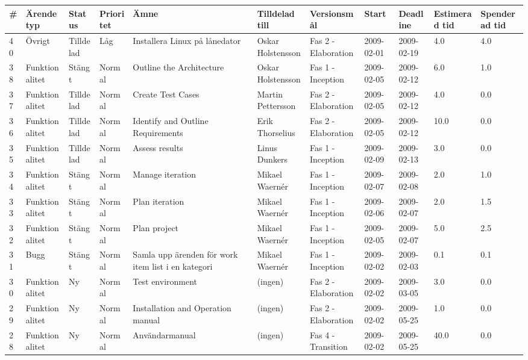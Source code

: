 \begin{center}
	\begin{tabular}{| m{0.5cm} | l | l | l | m{5cm} | l | l | l | l | m{1.5cm} | m{1.5cm} |}
\hline \# & Ärendetyp & Status & Prioritet & Ämne & Tilldelad till & Versionsmål & Start & Deadline & Estimerad tid & Spenderad tid \\
\hline 40 & Övrigt & Tilldelad & Låg & Installera Linux på lånedator & Oskar Holstensson & Fas 2 - Elaboration & 2009-02-01 & 2009-02-19 & 4.0 & 4.0\\
\hline 38 & Funktionalitet & Stängt & Normal & Outline the Architecture & Oskar Holstensson & Fas 1 - Inception & 2009-02-05 & 2009-02-12 & 6.0 & 1.0 \\
\hline 37 & Funktionalitet & Tilldelad & Normal & Create Test Cases & Martin Pettersson & Fas 2 - Elaboration & 2009-02-05 & 2009-02-12 & 4.0 & 0.0 \\
\hline 36 & Funktionalitet & Tilldelad & Normal & Identify and Outline Requirements & Erik Thorselius & Fas 2 - Elaboration & 2009-02-05 & 2009-02-12 & 10.0 & 0.0 \\
\hline 35 & Funktionalitet & Tilldelad & Normal & Assess results & Linus Dunkers & Fas 1 - Inception & 2009-02-09 & 2009-02-13 & 3.0 & 0.0 \\
\hline 34 & Funktionalitet & Stängt & Normal & Manage iteration & Mikael Waernér & Fas 1 - Inception & 2009-02-07 & 2009-02-08 & 2.0 & 1.0 \\
\hline 33 & Funktionalitet & Stängt & Normal & Plan iteration & Mikael Waernér & Fas 1 - Inception & 2009-02-06 & 2009-02-07 & 2.0 & 1.5 \\
\hline 32 & Funktionalitet & Stängt & Normal & Plan project & Mikael Waernér & Fas 1 - Inception & 2009-02-05 & 2009-02-07 & 5.0 & 2.5 \\
\hline 31 & Bugg & Stängt & Normal & Samla upp ärenden för work item list i en kategori & Mikael Waernér & Fas 1 - Inception & 2009-02-02 & 2009-02-03 & 0.1 & 0.1 \\
\hline 30 & Funktionalitet & Ny & Normal & Test environment & (ingen) & Fas 2 - Elaboration & 2009-02-02 & 2009-03-05 & 3.0 & 0.0 \\
\hline 29 & Funktionalitet & Ny & Normal & Installation and Operation manual & (ingen) & Fas 2 - Elaboration & 2009-02-02 & 2009-05-25 & 1.0 & 0.0 \\
\hline 28 & Funktionalitet & Ny & Normal & Användarmanual & (ingen) & Fas 4 - Transition & 2009-02-02 & 2009-05-25 & 40.0 & 0.0 \\

\end{tabular}
\end{center}
